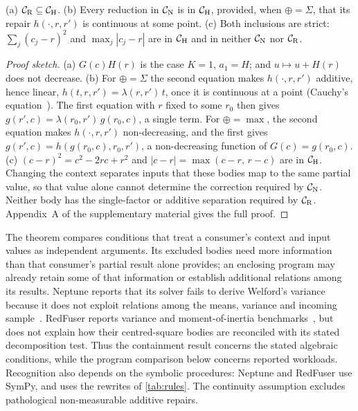 \begin{theorem}[Containment]
\label{thm:containment}
(a) $\mathcal{C}_{\mathrm{R}}\subseteq\mathcal{C}_{\mathrm{H}}$.
(b) Every reduction in $\mathcal{C}_{\mathrm{N}}$ is in $\mathcal{C}_{\mathrm{H}}$, provided, when $\oplus=\Sigma$, that its repair $h(\cdot,r,r')$ is continuous at some point.
(c) Both inclusions are strict: $\sum_j (c_j-r)^2$ and $\max_j |c_j-r|$ are in $\mathcal{C}_{\mathrm{H}}$ and in neither $\mathcal{C}_{\mathrm{N}}$ nor $\mathcal{C}_{\mathrm{R}}$.
\end{theorem}

\begin{proof}[Proof sketch]
(a) $G(c)H(r)$ is the case $K=1$, $a_1=H$; and $u\mapsto u+H(r)$ does not decrease.
(b) For $\oplus=\Sigma$ the second equation makes $h(\cdot,r,r')$ additive, hence linear, $h(t,r,r')=\lambda(r,r')\,t$, once it is continuous at a point (Cauchy's equation~\citep{kuczma}).
The first equation with $r$ fixed to some $r_0$ then gives $g(r',c)=\lambda(r_0,r')\,g(r_0,c)$, a single term.
For $\oplus=\max$, the second equation makes $h(\cdot,r,r')$ non-decreasing, and the first gives $g(r',c)=h(g(r_0,c),r_0,r')$, a non-decreasing function of $G(c)=g(r_0,c)$.
(c) $(c-r)^2=c^2-2rc+r^2$ and $|c-r|=\max(c-r,\,r-c)$ are in $\mathcal{C}_{\mathrm{H}}$.
Changing the context separates inputs that these bodies map to the same partial value, so that value alone cannot determine the correction required by $\mathcal{C}_{\mathrm{N}}$.
Neither body has the single-factor or additive separation required by $\mathcal{C}_{\mathrm{R}}$.
Appendix~A of the supplementary material gives the full proof.
\end{proof}

The theorem compares conditions that treat a consumer's context and input values as independent arguments.
Its excluded bodies need more information than that consumer's partial result alone provides; an enclosing program may already retain some of that information or establish additional relations among its results.
Neptune reports that its solver fails to derive Welford's variance because it does not exploit relations among the means, variance and incoming sample~\citep[\S4.2]{neptune}.
RedFuser reports variance and moment-of-inertia benchmarks~\citep[App.~A.6]{redfuser}, but does not explain how their centred-square bodies are reconciled with its stated decomposition test.
Thus the containment result concerns the stated algebraic conditions, while the program comparison below concerns reported workloads.
Recognition also depends on the symbolic procedures: Neptune and RedFuser use SymPy, and \sys uses the rewrites of \cref{tab:rules}.
The continuity assumption excludes pathological non-measurable additive repairs.

